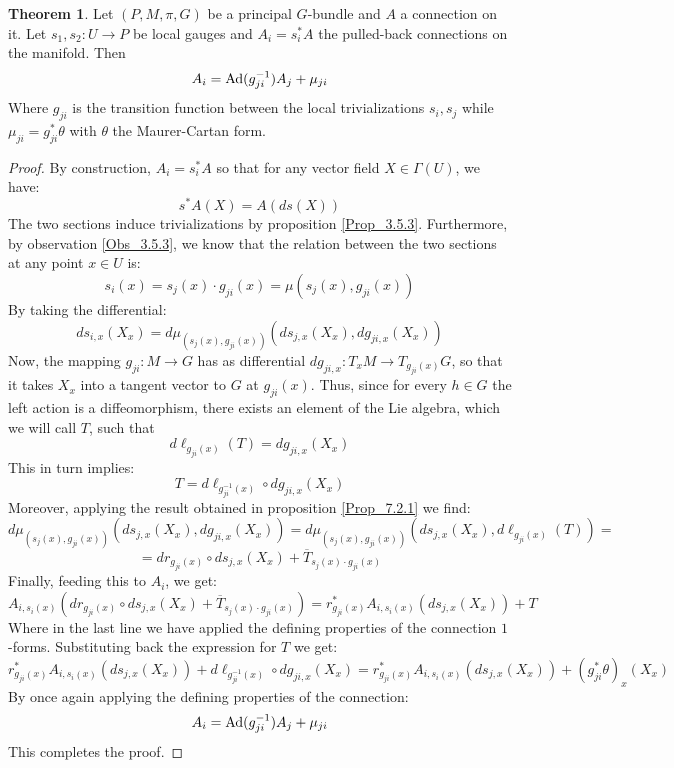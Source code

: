 \documentclass[12pt,a4paper]{report}
\theoremstyle{definition}
\theoremstyle{Theorem}
\newtheorem{Theo}[Def]{Theorem}
\theoremstyle{definition}
\theoremstyle{definition}
\begin{document}
	\begin{Theo} \label{Theo_7.2.1}
		Let $(P,M,\pi,G)$ be a principal $G$-bundle and $A$ a connection on it. Let $s_1,s_2:U\rightarrow P$ be local gauges and $A_{i}=s_i^*A$ the pulled-back connections on the manifold. Then 
		$$A_i=\hbox{Ad}(g_{ji}^{-1})A_j+\mu_{ji}$$
		Where $g_{ji}$ is the transition function between the local trivializations $s_i,s_j$ while $\mu_{ji}=g_{ji}^*\theta$ with $\theta$ the Maurer-Cartan form.
	\end{Theo}
	\begin{proof}
		By construction, $A_i=s_i^*A$ so that for any vector field $X\in \Gamma(U)$, we have:
		$$s^*A(X)=A(ds(X))$$
		The two sections induce trivializations by proposition \ref{Prop_3.5.3}. Furthermore, by observation \ref{Obs_3.5.3}, we know that the relation between the two sections at any point $x\in U$ is:
		$$s_i(x)=s_j(x)\cdot g_{ji}(x)=\mu(s_j(x),g_{ji}(x))$$
		By taking the differential:
		$$ds_{i,x}(X_x)=d\mu_{(s_{j}(x), g_{ji}(x))}(ds_{j,x}(X_x),dg_{ji,x}(X_x))$$
		Now, the mapping $g_{ji}:M\rightarrow G$ has as differential $dg_{ji,x}:T_xM\rightarrow T_{g_{ji}(x)}G$, so that it takes $X_x$ into a tangent vector to $G$ at $g_{ji}(x)$. Thus, since for every $h\in G$ the left action is a diffeomorphism, there exists an element of the Lie algebra, which we will call $T$, such that 
		$$d\ell_{g_{ji}(x)}(T)=dg_{ji,x}(X_x)$$
		This in turn implies:
		$$T=d\ell_{g^{-1}_{ji}(x)}\circ dg_{ji,x}(X_x)$$
		Moreover, applying the result obtained in proposition \ref{Prop_7.2.1} we find:
		$$d\mu_{(s_{j}(x), g_{ji}(x))}(ds_{j,x}(X_x),dg_{ji,x}(X_x))=d\mu_{(s_{j}(x), g_{ji}(x))}(ds_{j,x}(X_x),d\ell_{g_{ji}(x)}(T))=$$
		$$=dr_{g_{ji}(x)}\circ ds_{j,x}(X_x)+\overline{T}_{s_{j}(x)\cdot g_{ji}(x)}$$
		Finally, feeding this to $A_i$, we get:
		$$A_{i,s_i(x)}(dr_{g_{ji}(x)}\circ ds_{j,x}(X_x)+\overline{T}_{s_{j}(x)\cdot g_{ji}(x)})=r^*_{g_{ji}(x)}A_{i,{s_i(x)}}(ds_{j,x}(X_x))+T$$
		Where in the last line we have applied the defining properties of the connection $1$-forms. Substituting back the expression for $T$ we get:
		$$r^*_{g_{ji}(x)}A_{i,{s_i(x)}}(ds_{j,x}(X_x))+d\ell_{g^{-1}_{ji}(x)}\circ dg_{ji,x}(X_x)=r^*_{g_{ji}(x)}A_{i,{s_i(x)}}(ds_{j,x}(X_x))+(g^*_{ji}\theta)_x(X_x)$$
		By once again applying the defining properties of the connection:
		$$A_i=\hbox{Ad}(g_{ji}^{-1})A_j+\mu_{ji}$$
		This completes the proof.
	\end{proof}
\end{document}
